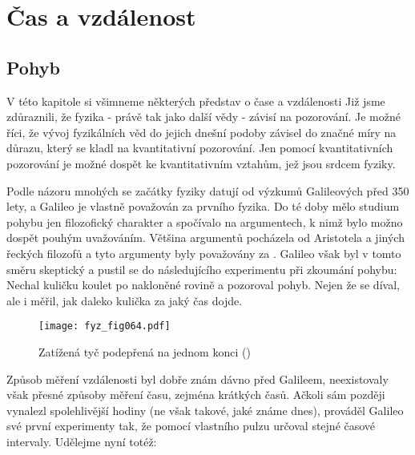 {
\chapter{Čas a vzdálenost}\label{chap:fey_cas}
\minitoc
  \section{Pohyb}
    V této kapitole si všimneme některých představ o čase a vzdálenosti Již jsme zdůraznili, že 
    fyzika - právě tak jako další vědy - závisí na pozorování. Je možné říci, že vývoj fyzikálních 
    věd do jejich dnešní podoby závisel do značné míry na důrazu, který se kladl na kvantitativní 
    pozorování. Jen pomocí kvantitativních pozorování je možné dospět ke kvantitativním vztahům, 
    jež jsou srdcem fyziky.
    
    Podle názoru mnohých se začátky fyziky datují od výzkumů Galileových před 350 lety, a Galileo 
    je vlastně považován za prvního fyzika. Do té doby mělo studium pohybu jen filozofický 
    charakter a spočívalo na argumentech, k nimž bylo možno dospět pouhým uvažováním. Většina 
    argumentů pocházela od Aristotela a jiných řeckých filozofů a tyto argumenty byly považovány za 
    . Galileo však byl v tomto směru skeptický a pustil se do následujícího 
    experimentu při zkoumání pohybu: Nechal kuličku koulet po nakloněné rovině a pozoroval pohyb. 
    Nejen že se díval, ale i měřil, jak daleko kulička za jaký čas dojde.
    
    \begin{figure}[ht!]  %
      \centering
      \texttt{[image: fyz\_fig064.pdf]}
      \caption{Zatížená tyč podepřená na jednom konci (\cite[s.~64]{Feynman01})}
      \label{fyz:fig064}
    \end{figure}
    
    Způsob měření vzdálenosti byl dobře znám dávno před Galileem, neexistovaly však přesné způsoby 
    měření času, zejména krátkých časů. Ačkoli sám později vynalezl spolehlivější hodiny (ne však 
    takové, jaké známe dnes), prováděl Galileo své první experimenty tak, že pomocí vlastního 
    pulzu určoval stejné časové intervaly. Udělejme nyní totéž:
    
}
